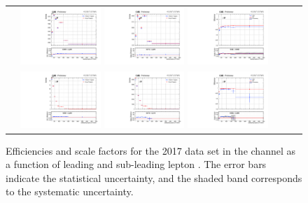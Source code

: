 \begin{figure}[!htb]
  \begin{center}
    \begin{tabular}{ccc}
      \includegraphics[width=0.30\textwidth]{fig_2017_TrigSF/g_lepApt_mumu_MC.pdf}
      \includegraphics[width=0.30\textwidth]{fig_2017_TrigSF/g_lepApt_mumu_data.pdf}
      \includegraphics[width=0.30\textwidth]{fig_2017_TrigSF/g_mumu_lepApt_FullSystUncBand.pdf}\\
      \includegraphics[width=0.30\textwidth]{fig_2017_TrigSF/g_lepBpt_mumu_MC.pdf}
      \includegraphics[width=0.30\textwidth]{fig_2017_TrigSF/g_lepBpt_mumu_data.pdf}
      \includegraphics[width=0.30\textwidth]{fig_2017_TrigSF/g_mumu_lepBpt_FullSystUncBand.pdf}\\
    \end{tabular}
    \caption{Efficiencies and scale factors for the 2017 data set in the \mumu channel as a function of leading and sub-leading lepton \pT.
            The error bars indicate the statistical uncertainty, and the shaded band corresponds to the systematic uncertainty.
            }
    \label{TrigSF_2017_3}
  \end{center}
\end{figure}

